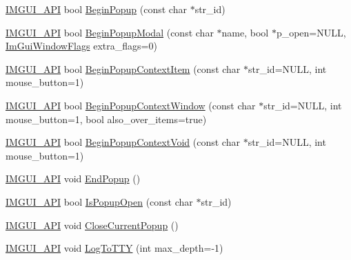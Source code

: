\begin{DoxyCompactItemize}
\item 
\mbox{\hyperlink{imgui_8h_a43829975e84e45d1149597467a14bbf5}{I\+M\+G\+U\+I\+\_\+\+A\+PI}} bool \mbox{\hyperlink{namespace_im_gui_ab71527de4b52ff970e5396040302e134}{Begin\+Popup}} (const char $\ast$str\+\_\+id)
\item 
\mbox{\hyperlink{imgui_8h_a43829975e84e45d1149597467a14bbf5}{I\+M\+G\+U\+I\+\_\+\+A\+PI}} bool \mbox{\hyperlink{namespace_im_gui_aa70aaf1dacf5702f85feca6f729a307a}{Begin\+Popup\+Modal}} (const char $\ast$name, bool $\ast$p\+\_\+open=N\+U\+LL, \mbox{\hyperlink{imgui_8h_a0b8e067ab4f7a818828c8d89e531addc}{Im\+Gui\+Window\+Flags}} extra\+\_\+flags=0)
\item 
\mbox{\hyperlink{imgui_8h_a43829975e84e45d1149597467a14bbf5}{I\+M\+G\+U\+I\+\_\+\+A\+PI}} bool \mbox{\hyperlink{namespace_im_gui_a579fc507f5b5d164c8fd628aee3d7bbd}{Begin\+Popup\+Context\+Item}} (const char $\ast$str\+\_\+id=N\+U\+LL, int mouse\+\_\+button=1)
\item 
\mbox{\hyperlink{imgui_8h_a43829975e84e45d1149597467a14bbf5}{I\+M\+G\+U\+I\+\_\+\+A\+PI}} bool \mbox{\hyperlink{namespace_im_gui_acf98c99f041ea341d0328e071c56411b}{Begin\+Popup\+Context\+Window}} (const char $\ast$str\+\_\+id=N\+U\+LL, int mouse\+\_\+button=1, bool also\+\_\+over\+\_\+items=true)
\item 
\mbox{\hyperlink{imgui_8h_a43829975e84e45d1149597467a14bbf5}{I\+M\+G\+U\+I\+\_\+\+A\+PI}} bool \mbox{\hyperlink{namespace_im_gui_a87a2228929503fff067d2e167a690751}{Begin\+Popup\+Context\+Void}} (const char $\ast$str\+\_\+id=N\+U\+LL, int mouse\+\_\+button=1)
\item 
\mbox{\hyperlink{imgui_8h_a43829975e84e45d1149597467a14bbf5}{I\+M\+G\+U\+I\+\_\+\+A\+PI}} void \mbox{\hyperlink{namespace_im_gui_aa6a9b5696f2ea7eed7683425fc77b8f2}{End\+Popup}} ()
\item 
\mbox{\hyperlink{imgui_8h_a43829975e84e45d1149597467a14bbf5}{I\+M\+G\+U\+I\+\_\+\+A\+PI}} bool \mbox{\hyperlink{namespace_im_gui_a8f25c1565fca7cb9796c54e5cebc44ee}{Is\+Popup\+Open}} (const char $\ast$str\+\_\+id)
\item 
\mbox{\hyperlink{imgui_8h_a43829975e84e45d1149597467a14bbf5}{I\+M\+G\+U\+I\+\_\+\+A\+PI}} void \mbox{\hyperlink{namespace_im_gui_aeaec6479834db7918260fc082107f90b}{Close\+Current\+Popup}} ()
\item 
\mbox{\hyperlink{imgui_8h_a43829975e84e45d1149597467a14bbf5}{I\+M\+G\+U\+I\+\_\+\+A\+PI}} void \mbox{\hyperlink{namespace_im_gui_a37696f5296f33ae4218f53b40b81cccc}{Log\+To\+T\+TY}} (int max\+\_\+depth=-\/1)
\item 

\end{DoxyCompactItemize}
